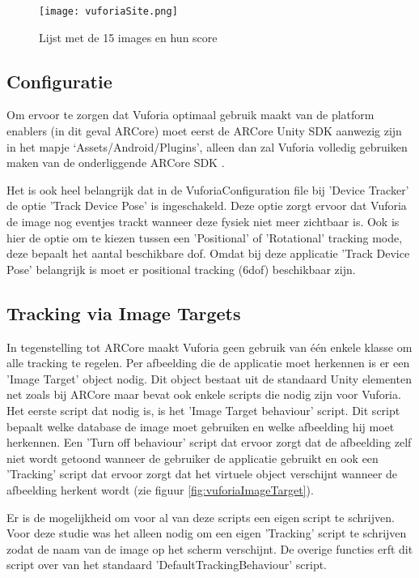 \begin{figure}
    \texttt{[image: vuforiaSite.png]}
    \caption{Lijst met de 15 images en hun score}
    \label{fig:vuforiaDatabase}
\end{figure}

\subsection{Configuratie}
Om ervoor te zorgen dat Vuforia optimaal gebruik maakt van de platform enablers (in dit geval ARCore) moet eerst de ARCore Unity SDK aanwezig zijn in het mapje `Assets/Android/Plugins', alleen dan zal Vuforia volledig gebruiken maken van de onderliggende ARCore SDK \autocite{VuforiaARCore}.

Het is ook heel belangrijk dat in de VuforiaConfiguration file bij 'Device Tracker' de optie 'Track Device Pose' is ingeschakeld. Deze optie zorgt ervoor dat Vuforia de image nog eventjes trackt wanneer deze fysiek niet meer zichtbaar is. Ook is hier de optie om te kiezen tussen een 'Positional' of 'Rotational' tracking mode, deze bepaalt het aantal beschikbare \acrlong{dof}. Omdat bij deze applicatie 'Track Device Pose' belangrijk is moet er positional tracking (\acrshort{6dof}) beschikbaar zijn.

\subsection{Tracking via Image Targets}
In tegenstelling tot ARCore maakt Vuforia geen gebruik van één enkele klasse om alle tracking te regelen. Per afbeelding die de applicatie moet herkennen is er een 'Image Target' object nodig. Dit object bestaat uit de standaard Unity elementen net zoals bij ARCore maar bevat ook enkele scripts die nodig zijn voor Vuforia. Het eerste script dat nodig is, is het 'Image Target behaviour' script. Dit script bepaalt welke database de image moet gebruiken en welke afbeelding hij moet herkennen. Een 'Turn off behaviour' script dat ervoor zorgt dat de afbeelding zelf niet wordt getoond wanneer de gebruiker de applicatie gebruikt en ook een 'Tracking' script dat ervoor zorgt dat het virtuele object verschijnt wanneer de afbeelding herkent wordt (zie figuur \ref{fig:vuforiaImageTarget}). 

Er is de mogelijkheid om voor al van deze scripts een eigen script te schrijven. Voor deze studie was het alleen nodig om een eigen 'Tracking' script te schrijven zodat de naam van de image op het scherm verschijnt. De overige functies erft dit script over van het standaard 'DefaultTrackingBehaviour' script.

